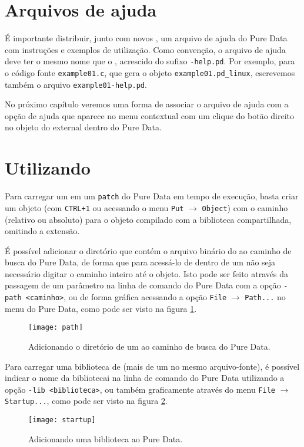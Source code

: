 \section{Arquivos de ajuda}

É importante distribuir, junto com novos \externals, um arquivo de ajuda do
Pure Data com instruções e exemplos de utilização. Como convenção, o arquivo
de ajuda deve ter o mesmo nome que o \external, acrescido do sufixo
\texttt{-help.pd}. Por exemplo, para o código fonte \texttt{example01.c}, que
gera o objeto \texttt{example01.pd\_linux}, escrevemos também o arquivo
\texttt{example01-help.pd}.

No próximo capítulo veremos uma forma de associar o arquivo de ajuda com a
opção de ajuda que aparece no menu contextual com um clique do botão direito
no objeto do external dentro do Pure Data.

\section{Utilizando \externals}
\label{sec:using}

Para carregar um \external em um \texttt{patch} do Pure Data em tempo de
execução, basta criar um objeto (com \texttt{CTRL+1} ou acessando o menu
\texttt{Put} $\rightarrow$ \texttt{Object}) com o caminho (relativo ou
absoluto) para o objeto compilado com a biblioteca compartilhada, omitindo a
extensão.

É possível adicionar o diretório que contém o arquivo binário do \external ao
caminho de busca do Pure Data, de forma que para acessá-lo de dentro de um
\patch não seja necessário digitar o caminho inteiro até o objeto. Isto pode
ser feito através da passagem de um parâmetro na linha de comando do Pure Data
com a opção \texttt{-path <caminho>}, ou de forma gráfica acessando a opção
\texttt{File} $\rightarrow$ \texttt{Path...} no menu do Pure Data,
como pode ser visto na figura \ref{fig:search-path}.

\begin{figure}[h!]
  \centering
  \texttt{[image: path]}
  \caption{Adicionando o diretório de um \external ao caminho de busca do Pure Data.}
  \label{fig:search-path}
\end{figure}

Para carregar uma biblioteca de \externals (mais de um \external no mesmo
arquivo-fonte), é possível indicar o nome da bibliotecai na linha
de comando do Pure Data utilizando a opção \texttt{-lib <biblioteca>}, ou
também graficamente através do menu \texttt{File} $\rightarrow$
\texttt{Startup...}, como pode ser visto na figura \ref{fig:lib}.

\begin{figure}[h!]
  \centering
  \texttt{[image: startup]}
  \caption{Adicionando uma biblioteca ao Pure Data.}
  \label{fig:lib}
\end{figure}

